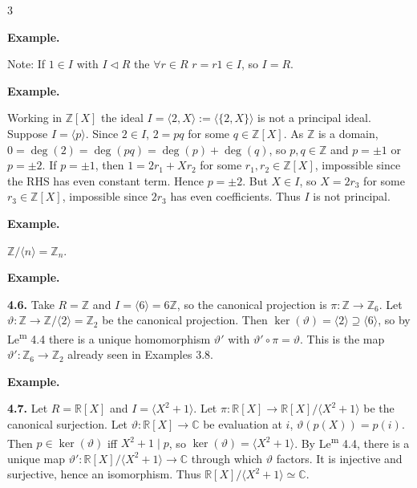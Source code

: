 \documentclass[8pt]{extarticle}
\newenvironment{example}{%
  \begin{tcolorbox}[exampleboxstyle]%
  \textbf{Example.}\ \normalfont
  \ignorespaces
}{%
  \end{tcolorbox}%
}
\begin{document}
\begin{multicols*}{3}
\begin{example}
            {\footnotesize Note: If \(1\in I\) with \(I\lhd R\) the \(\forall r \in R\) \(r=r1\in I\), so \(I=R\).}
        \end{example}

        \begin{example}
            Working in \(\mathbb{Z}[X]\) the ideal \(I=\langle 2,X\rangle:=\langle \{2,X\}\rangle\) is not a principal ideal. Suppose \(I=\langle p\rangle\). Since \(2\in I\), \(2=pq\) for some \(q\in\mathbb{Z}[X]\). As \(\mathbb{Z}\) is a domain, \(0=\deg(2)=\deg(pq)=\deg(p)+\deg(q)\), so \(p,q\in\mathbb{Z}\) and \(p=\pm1\) or \(p=\pm2\). If \(p=\pm1\), then \(1=2r_1+Xr_2\) for some \(r_1,r_2\in\mathbb{Z}[X]\), impossible since the RHS has even constant term. Hence \(p=\pm2\). But \(X\in I\), so \(X=2r_3\) for some \(r_3\in\mathbb{Z}[X]\), impossible since \(2r_3\) has even coefficients. Thus \(I\) is not principal.
        \end{example}

        \begin{example}
            \(\mathbb{Z}/\langle n\rangle=\mathbb{Z}_n\).
        \end{example}

        \begin{example}
            \textbf{4.6.} Take \(R=\mathbb{Z}\) and \(I=\langle6\rangle=6\mathbb{Z}\), so the canonical projection is \(\pi:\mathbb{Z}\to\mathbb{Z}_6\). Let \(\vartheta:\mathbb{Z}\to\mathbb{Z}/\langle2\rangle=\mathbb{Z}_2\) be the canonical projection. Then \(\ker(\vartheta)=\langle2\rangle\supseteq\langle6\rangle\), so by Le\textsuperscript{m} 4.4 there is a unique homomorphism \(\vartheta'\) with \(\vartheta'\circ\pi=\vartheta\). This is the map \(\vartheta':\mathbb{Z}_6\to\mathbb{Z}_2\) already seen in Examples 3.8.
        \end{example}

        \begin{example}
            \textbf{4.7.} Let \(R=\mathbb{R}[X]\) and \(I=\langle X^2+1\rangle\). Let \(\pi:\mathbb{R}[X]\to\mathbb{R}[X]/\langle X^2+1\rangle\) be the canonical surjection. Let \(\vartheta:\mathbb{R}[X]\to\mathbb{C}\) be evaluation at \(i\), \(\vartheta(p(X))=p(i)\). Then \(p\in\ker(\vartheta)\) iff \(X^2+1\mid p\), so \(\ker(\vartheta)=\langle X^2+1\rangle\). By Le\textsuperscript{m} 4.4, there is a unique map \(\vartheta':\mathbb{R}[X]/\langle X^2+1\rangle\to\mathbb{C}\) through which \(\vartheta\) factors. It is injective and surjective, hence an isomorphism. Thus \(\mathbb{R}[X]/\langle X^2+1\rangle\simeq\mathbb{C}\).
        \end{example}


\end{multicols*}
\end{document}
